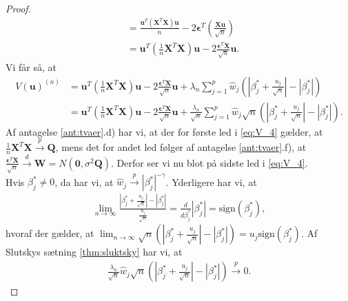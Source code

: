 \begin{proof}
\begin{align*}
& = \frac{\textbf{u}^T (\textbf{X}^T\textbf{X})  \textbf{u}}{n} - 2 \boldsymbol{\epsilon}^T \left( \frac{\mathbf{X}\mathbf{u}}{\sqrt{n}} \right) \\ 
&= \textbf{u}^T \left(\frac{1}{n}\textbf{X}^T\textbf{X}\right)  \textbf{u}- 2 \frac{\boldsymbol{\epsilon}^T \textbf{X}}{\sqrt{n}}\textbf{u}.
\end{align*}
Vi får så, at 
\begin{align}
V(\mathbf{u})^{(n)} & = \textbf{u}^T \left(\frac{1}{n}\textbf{X}^T\textbf{X}\right)  \textbf{u} - 2 \frac{\boldsymbol{\epsilon}^T \textbf{X}}{\sqrt{n}}\textbf{u} + \lambda_n \sum_{j=1}^p \hat{w}_j \left( \left\vert \beta_j^{*} + \frac{u_j}{\sqrt{n}} \right\vert - \left\vert \beta_j^{*}\right\vert
\right) \nonumber \\
 & = \textbf{u}^T \left(\frac{1}{n}\textbf{X}^T\textbf{X}\right)  \textbf{u} - 2 \frac{\boldsymbol{\epsilon}^T \textbf{X}}{\sqrt{n}}\textbf{u} +\frac{\lambda_n}{\sqrt{n}} \sum_{j=1}^p \hat{w}_j \sqrt{n} \left( \left\vert \beta_j^{*} + \frac{u_j}{\sqrt{n}} \right\vert - \left\vert \beta_j^{*} \right\vert
\right). \label{eq:V_4}
\end{align}
%
Af antagelse \ref{ant:tvaer}.d) har vi, at der for første led i \eqref{eq:V_4} gælder, at $\frac{1}{n} \mathbf{X}^T \mathbf{X} \overset{p}{\rightarrow} \mathbf{Q}$, mens det for andet led følger af antagelse \ref{ant:tvaer}.f), at $\frac{\boldsymbol{\epsilon}^T \mathbf{X}}{\sqrt{n}} \overset{d}{\rightarrow} \textbf{W}=N(\textbf{0},\sigma^2 \boldsymbol{Q})$. Derfor ser vi nu blot på sidste led i \eqref{eq:V_4}. \\
Hvis $\beta_j^{*} \neq 0$, da har vi, at $\hat{w}_j \overset{p}{\rightarrow} \left\vert \beta_j^{*} \right\vert^{-\gamma}$. Yderligere har vi, at 
\begin{align*}
\lim_{n\rightarrow \infty}
\frac{\left\vert \beta_j^{*} +\frac{u_j}{\sqrt{n}} \right\vert - \left\vert \beta_j^{*} \right\vert}{\frac{u_j}{\sqrt{n}}} =\frac{d}{d \beta_j^{*}} \left\vert \beta_j^{*} \right\vert =\text{sign}\left(\beta_j^{*} \right),
\end{align*} 
hvoraf der gælder, at $\lim_{n\rightarrow \infty} \sqrt{n} \left( \left\vert \beta_j^{*} +\frac{u_j}{\sqrt{n}} \right\vert - \left\vert \beta_j^{*} \right\vert \right) = u_j \text{sign}\left(\beta_j^{*} \right)$.
Af Slutskys sætning \ref{thm:sluktsky} har vi, at 
\begin{align*}
\frac{ \lambda_n}{\sqrt{n}} \hat{w}_j \sqrt{n} \left(\left\vert \beta_j^{*} +\frac{u_j}{\sqrt{n}} \right\vert - \left\vert \beta_j^{*} \right\vert \right) \overset{p}{\rightarrow} 0.

\end{align*}
\end{proof}
